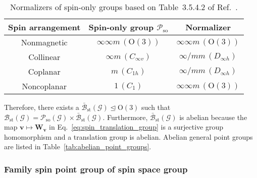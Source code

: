 \begin{table}[tb]
  \centering
  \caption{
    Normalizers of spin-only groups based on Table~3.5.4.2 of Ref.~\cite{koch2016normalizers}.
  }
  \label{tab:spin_only_normalizers}
  \begin{tabular}{ccc}
    \hline \hline
    Spin arrangement & Spin-only group $\mathcal{P}_{\mathrm{so}}$ & Normalizer \\
    \hline
    Nonmagnetic & $\infty \infty m \,(\mathrm{O}(3))$ & $\infty \infty m \,(\mathrm{O}(3))$ \\
    Collinear & $\infty m \,(C_{\infty v})$ & $\infty / mm \, (D_{\infty h})$ \\
    Coplanar & $m \,(C_{1h})$ & $\infty / mm \, (D_{\infty h})$ \\
    Noncoplanar & $1 \, (C_{1})$ & $\infty \infty m \,(\mathrm{O}(3))$ \\
    \hline \hline
  \end{tabular}
\end{table}

Therefore, there exists a  $\bar{\mathcal{B}}_{\mathrm{st}}(\mathcal{G}) \trianglelefteq \mathrm{O}(3)$ such that $\mathcal{B}_{\mathrm{st}}(\mathcal{G}) = \mathcal{P}_{\mathrm{so}}(\mathcal{G}) \times \bar{\mathcal{B}}_{\mathrm{st}}(\mathcal{G})$.
Furthermore, $\bar{\mathcal{B}}_{\mathrm{st}}(\mathcal{G})$ is abelian because the map $\bm{v} \mapsto \bm{W}_{\bm{v}}$ in Eq.~\eqref{eq:spin_translation_group} is a surjective group homomorphism and a translation group is abelian.
Abelian general point groups are listed in Table~\ref{tab:abelian_point_groups}.

\subsubsection{\label{sec:family_spin_point_group}Family spin point group of spin space group}

